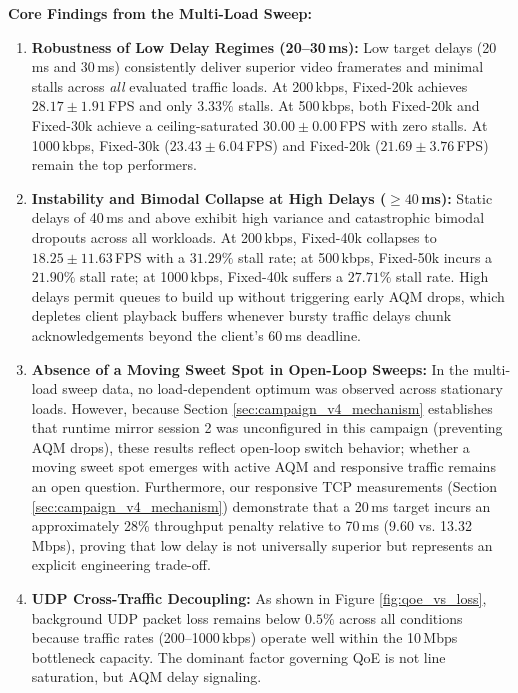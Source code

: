 \documentclass[12pt,a4paper,oneside]{report}
\begin{document}
\textbf{Core Findings from the Multi-Load Sweep:}
\begin{enumerate}[label=\arabic*.]
  \item \textbf{Robustness of Low Delay Regimes (20--30\,ms):} Low target delays (20\,ms and 30\,ms) consistently deliver superior video framerates and minimal stalls across \emph{all} evaluated traffic loads. At 200\,kbps, Fixed-20k achieves $28.17 \pm 1.91$\,FPS and only $3.33\%$ stalls. At 500\,kbps, both Fixed-20k and Fixed-30k achieve a ceiling-saturated $30.00 \pm 0.00$\,FPS with zero stalls. At 1000\,kbps, Fixed-30k ($23.43 \pm 6.04$\,FPS) and Fixed-20k ($21.69 \pm 3.76$\,FPS) remain the top performers.
  \item \textbf{Instability and Bimodal Collapse at High Delays ($\ge 40$\,ms):} Static delays of 40\,ms and above exhibit high variance and catastrophic bimodal dropouts across all workloads. At 200\,kbps, Fixed-40k collapses to $18.25 \pm 11.63$\,FPS with a $31.29\%$ stall rate; at 500\,kbps, Fixed-50k incurs a $21.90\%$ stall rate; at 1000\,kbps, Fixed-40k suffers a $27.71\%$ stall rate. High delays permit queues to build up without triggering early AQM drops, which depletes client playback buffers whenever bursty traffic delays chunk acknowledgements beyond the client's 60\,ms deadline.
  \item \textbf{Absence of a Moving Sweet Spot in Open-Loop Sweeps:} In the multi-load sweep data, no load-dependent optimum was observed across stationary loads. However, because Section \ref{sec:campaign_v4_mechanism} establishes that runtime mirror session 2 was unconfigured in this campaign (preventing AQM drops), these results reflect open-loop switch behavior; whether a moving sweet spot emerges with active AQM and responsive traffic remains an open question. Furthermore, our responsive TCP measurements (Section \ref{sec:campaign_v4_mechanism}) demonstrate that a 20\,ms target incurs an approximately 28\% throughput penalty relative to 70\,ms (9.60 vs. 13.32\,Mbps), proving that low delay is not universally superior but represents an explicit engineering trade-off.
  \item \textbf{UDP Cross-Traffic Decoupling:} As shown in Figure \ref{fig:qoe_vs_loss}, background UDP packet loss remains below $0.5\%$ across all conditions because traffic rates (200--1000\,kbps) operate well within the 10\,Mbps bottleneck capacity. The dominant factor governing QoE is not line saturation, but AQM delay signaling.
\end{enumerate}
\end{document}
